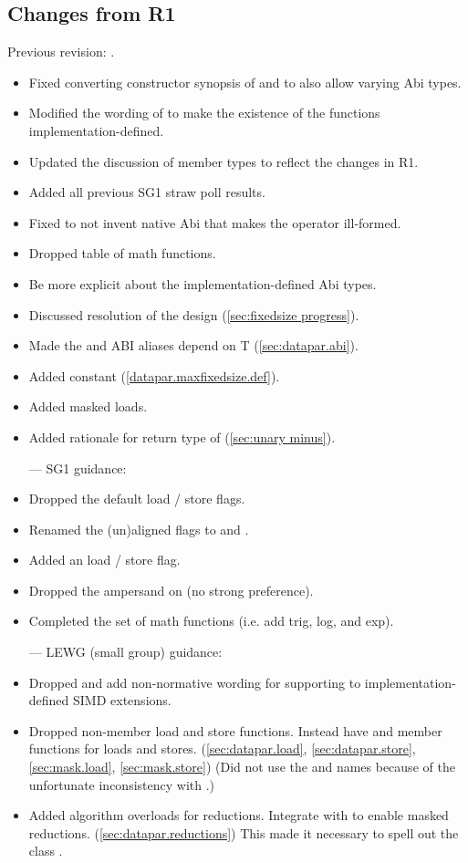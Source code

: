 \subsection{Changes from R1}
Previous revision: \citep{P0214R1}.
\begin{itemize}
    \item Fixed converting constructor synopsis of \datapar and \mask to also allow varying Abi types.
    \item Modified the wording of  to make the existence of the functions implementation-defined.
    \item Updated the discussion of member types to reflect the changes in R1.
    \item Added all previous SG1 straw poll results.
    \item Fixed  to not invent native Abi that makes the operator ill-formed.
    \item Dropped table of math functions.
    \item Be more explicit about the implementation-defined Abi types.
    \item Discussed resolution of the \fixedsizeN design (\ref{sec:fixedsize progress}).
    \item Made the  and  ABI aliases depend on \type T (\ref{sec:datapar.abi}).
    \item Added  constant (\ref{datapar.maxfixedsize.def}).
    \item Added masked loads.
    \item Added rationale for return type of \datapar[::operator-()] (\ref{sec:unary minus}).
  \color{black}\item[---] SG1 guidance:
    \item Dropped the default load / store flags.
    \item Renamed the (un)aligned flags to  and .
    \item Added an  load / store flag.
    \item Dropped the ampersand on  (no strong preference).
    \item Completed the set of math functions (i.e. add trig, log, and exp).
  \color{black}\item[---] LEWG (small group) guidance:
    \item Dropped  and add non-normative wording for supporting  to implementation-defined SIMD extensions.
    \item Dropped non-member load and store functions.
    Instead have  and  member functions for loads and stores. (\ref{sec:datapar.load}, \ref{sec:datapar.store}, \ref{sec:mask.load}, \ref{sec:mask.store})
    (Did not use the  and  names because of the unfortunate inconsistency with \std{}.)
    \item Added algorithm overloads for \datapar reductions.
    Integrate with  to enable masked reductions. (\ref{sec:datapar.reductions})
    This made it necessary to spell out the class .
\end{itemize}
